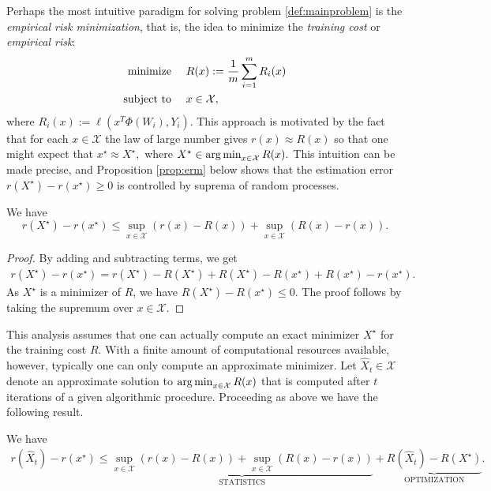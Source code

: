 Perhaps the most intuitive paradigm for solving problem \eqref{def:mainproblem} is the \emph{empirical risk minimization}, that is, the idea to minimize the \emph{training cost} or \emph{empirical risk}:
\begin{align}
	\begin{aligned}
		\text{minimize }\quad   & R(x) := \frac{1}{m} \sum_{i=1}^m R_i(x)\\
		\text{subject to }\quad & x\in \mathcal{X},
	\end{aligned}
	\label{def:mainproblem empirical risk}
\end{align}
where $R_i(x) := \ell(x^T\Phi(W_i),Y_i)$.
This approach is motivated by the fact that for each $x\in\mathcal{X}$ the law of large number gives
$
	r(x) \approx R(x)
$
so that one might expect that
$
	x^\star \approx X^\star,
$
where
$
	X^\star \in \operatorname*{arg\,min}_{x\in\mathcal{X}} R(x).
$
This intuition can be made precise, and Proposition \ref{prop:erm} below shows that the estimation error $r(X^\star) - r(x^\star) \ge 0$ is controlled by suprema of random processes.

\begin{proposition}
\label{prop:erm}
We have
$$
	r(X^\star) - r(x^\star)
	\le
	\sup_{x\in\mathcal{X}} ( r(x) - R(x) ) + \sup_{x\in\mathcal{X}} ( R(x) - r(x) ).
$$
\end{proposition}

\begin{proof}
By adding and subtracting terms, we get
\begin{align*}
	r(X^\star) - r(x^\star)
	= r(X^\star) - R(X^\star) + R(X^\star) - R(x^\star) + R(x^\star) - r(x^\star).
\end{align*}
As $X^\star$ is a minimizer of $R$, we have $R(X^\star) - R(x^\star) \le 0$. The proof follows by taking the supremum over $x\in\mathcal{X}$.
\end{proof}

This analysis assumes that one can actually compute an exact minimizer $X^\star$ for the training cost $R$. With a finite amount of computational resources available, however, typically one can only compute an approximate minimizer. Let $\hat X_t\in\mathcal{X}$ denote an approximate solution to $\operatorname*{arg\,min}_{x\in\mathcal{X}} R(x)$ that is computed after $t$ iterations of a given algorithmic procedure. Proceeding as above we have the following result.

\begin{proposition}
\label{prop:erm2}
We have
\begin{align}
	r(\hat X_t) - r(x^\star)
	\le
	\underbrace{\sup_{x\in\mathcal{X}} ( r(x) - R(x) ) + \sup_{x\in\mathcal{X}} ( R(x) - r(x) )}_{\textrm{STATISTICS}}
	+
	\underbrace{R(\hat X_t) - R(X^\star)}_{\textrm{OPTIMIZATION}}.
	\label{bound:stats-opt}
\end{align}
\end{proposition}

